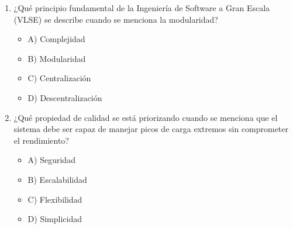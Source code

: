 \documentclass{article}
\begin{document}
\begin{enumerate}
    \item ¿Qué principio fundamental de la Ingeniería de Software a Gran Escala (VLSE) se describe cuando se menciona la modularidad?
    \begin{itemize}
        \item A) Complejidad
        \item B) Modularidad
        \item C) Centralización
        \item D) Descentralización
    \end{itemize}

    \item ¿Qué propiedad de calidad se está priorizando cuando se menciona que el sistema debe ser capaz de manejar picos de carga extremos sin comprometer el rendimiento?
    \begin{itemize}
        \item A) Seguridad
        \item B) Escalabilidad
        \item C) Flexibilidad
        \item D) Simplicidad
    \end{itemize}


\end{enumerate}
\end{document}
